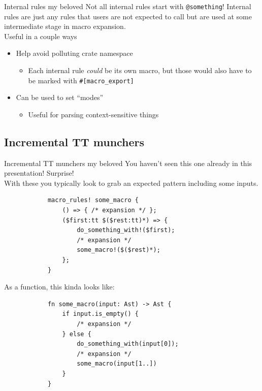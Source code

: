 \documentclass{beamer}
\begin{document}
	\begin{frame}{Internal rules my beloved}
		Not all internal rules start with \texttt{@something}! Internal rules are just any rules
		that users are not expected to call but are used at some intermediate stage in macro
		expansion. \\

		Useful in a couple ways
		\begin{itemize}
			\item Help avoid polluting crate namespace
			\begin{itemize}
				\item Each internal rule \emph{could} be its own macro, but those would also have to
					be marked with \texttt{\#[macro\_export]}
			\end{itemize}

			\item Can be used to set ``modes''
			\begin{itemize}
				\item Useful for parsing context-sensitive things
			\end{itemize}
		\end{itemize}
	\end{frame}

	\subsection{Incremental TT munchers}
	\begin{frame}[fragile]{Incremental TT munchers my beloved}
		You haven't seen this one already in this presentation! Surprise! \\

		With these you typically look to grab an expected pattern including some inputs.
		\begin{verbatim}
			macro_rules! some_macro {
				() => { /* expansion */ };
				($first:tt $($rest:tt)*) => {
					do_something_with!($first);
					/* expansion */
					some_macro!($($rest)*);
				};
			}
		\end{verbatim}
		As a function, this kinda looks like:
		\begin{verbatim}
			fn some_macro(input: Ast) -> Ast {
				if input.is_empty() {
					/* expansion */
				} else {
					do_something_with(input[0]);
					/* expansion */
					some_macro(input[1..])
				}
			}
		\end{verbatim}
	\end{frame}
\end{document}
